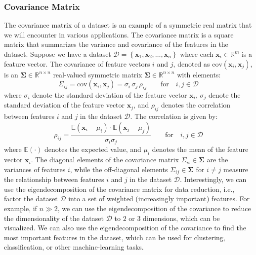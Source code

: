 \documentclass{article}[11pt]
\def\R{\mathbb{R}}
\def\D{\mathcal{D}}
\begin{document}
\subsubsection*{Covariance Matrix}
The covariance matrix of a dataset is an example of a symmetric real matrix that we will encounter in various applications.
The covariance matrix is a square matrix that summarizes the variance and covariance of the features in the dataset.
Suppose we have a dataset $\D = \left\{\mathbf{x}_{1},\mathbf{x}_{2},\dots,\mathbf{x}_{n}\right\}$ where each $\mathbf{x}_{i}\in\mathbb{R}^{m}$ is a feature vector.
The covariance of feature vectors $i$ and $j$, denoted as $\text{cov}\left(\mathbf{x}_{i},\mathbf{x}_{j}\right)$, is an $\mathbf{\Sigma}\in\mathbb{R}^{n\times{n}}$ 
real-valued symmetric matrix $\mathbf{\Sigma}\in\R^{n\times{n}}$ with elements: 
\begin{equation}
    \Sigma_{ij} = \text{cov}\left(\mathbf{x}_{i},\mathbf{x}_{j}\right) = \sigma_{i}\,\sigma_{j}\,\rho_{ij}\qquad\text{for}\quad{i,j \in \mathcal{D}}
\end{equation}
where $\sigma_{i}$ denote the standard deviation of the feature vector $\mathbf{x}_{i}$, $\sigma_{j}$ denote the standard deviation of the 
feature vector $\mathbf{x}_{j}$, and $\rho_{ij}$ denotes the correlation between features $i$ and $j$ in the dataset $\D$. The correlation is given by:
\begin{equation}
\rho_{ij} = \frac{\mathbb{E}(\mathbf{x}_{i}-\mu_{i})\cdot\mathbb{E}(\mathbf{x}_{j} - \mu_{j})}{\sigma_{i}\sigma_{j}}\qquad\text{for}\quad{i,j \in \mathcal{D}}
\end{equation}
where $\mathbb{E}(\cdot)$ denotes the expected value, and $\mu_{i}$ denotes the mean of the feature vector $\mathbf{x}_{i}$.
The diagonal elements of the covariance matrix $\Sigma_{ii}\in\mathbf{\Sigma}$ are the variances of features $i$,
while the off-diagonal elements $\Sigma_{ij}\in\mathbf{\Sigma}$ for $i\neq{j}$ measure the relationship between features 
$i$ and $j$ in the dataset $\mathcal{D}$. Interestingly, we can use the eigendecomposition of the covariance matrix for data reduction, 
i.e., factor the dataset $\D$ into a set of weighted (increasingly important) features. For example, if $n\gg{2}$, 
we can use the eigendecomposition of the covariance to reduce the dimensionality of the dataset $\D$ to $2$ or $3$ dimensions, which can be visualized.
We can also use the eigendecomposition of the covariance to find the most important features in the dataset, which can be used for clustering, classification, or other machine-learning tasks.
\end{document}
